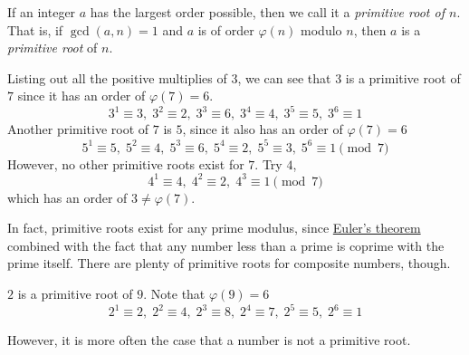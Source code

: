 \documentclass{article}
\newcounter{theorem}[section]
\newcounter{definition}[section]
\newcounter{example}[section]
\begin{document}
\begin{definition}
  \label{def:primitive-root-of-n}
If an integer $a$ has the largest order possible, then we call it a \textit{primitive root of $n$}. That is, if $\gcd(a, n) = 1$ and $a$ is of order $\varphi(n)$ modulo $n$, then $a$ is a \textit{primitive root} of $n$. 
\end{definition}

\begin{example}
  \label{ex:3-is-a-primitive-root-of-7}
Listing out all the positive multiplies of $3$, we can see that $3$ is a primitive root of $7$ since it has an order of $\varphi(7) = 6$.  
\begin{equation}
  3^1 \equiv 3, \; 3^2 \equiv 2, \; 3^3 \equiv 6, \; 3^4 \equiv 4, \; 3^5 \equiv 5, \; 3^6 \equiv 1
\end{equation}
Another primitive root of $7$ is $5$, since it also has an order of $\varphi(7) = 6$
\begin{equation}
  5^1 \equiv 5, \; 5^2 \equiv 4, \; 5^3 \equiv 6, \; 5^4 \equiv 2, \; 5^5 \equiv 3, \; 5^6 \equiv 1 \pmod{7}
\end{equation}
However, no other primitive roots exist for $7$. Try $4$, 
\begin{equation}
  4^1 \equiv 4, \; 4^2 \equiv 2, \; 4^3 \equiv 1 \pmod{7}
\end{equation}
which has an order of $3 \neq \varphi(7)$. 
\end{example}

In fact, primitive roots exist for any prime modulus, since \hyperref[thm:eulers-theorem]{Euler's theorem} combined with the fact that any number less than a prime is coprime with the prime itself. There are plenty of primitive roots for composite numbers, though. 

\begin{example}
  \label{ex:2-is-a-primitive-root-of-9}
$2$ is a primitive root of $9$. Note that $\varphi(9) = 6$
\begin{equation}
  2^1 \equiv 2,\; 2^2 \equiv 4, \;2^3 \equiv 8,\; 2^4 \equiv 7, \; 2^5 \equiv 5, \; 2^6 \equiv 1
\end{equation}
\end{example}

However, it is more often the case that a number is not a primitive root. 
\end{document}
